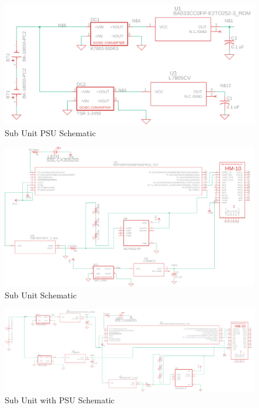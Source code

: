 \documentclass[12pt]{article}
\begin{document}
\begin{landscape}
  \begin{center}
  \begin{figure}[H]
    \includegraphics[width=1.6\textwidth, left]{../Modular Design/Sub-Unit-PSU/Figures/sub-unit-psu.png}
    \caption{Sub Unit PSU Schematic}
    \label{fig:sub-psu-schematic}
  \end{figure}
  \end{center}
  \begin{center}
  \begin{figure}[H]
    \includegraphics[width=1.6\textwidth, left]{../Appendix/Figures/sub-unit.png}
    \caption{Sub Unit Schematic}
    \label{fig:sub-schematic}
  \end{figure}
  \end{center}

  \begin{center}
  \begin{figure}[H]
    \includegraphics[width=\pdfpagewidth,height=0.65\textheight]{../Modular Design/Sub-Unit/Figures/sub-unit-and-psu.png}
    \caption{Sub Unit with PSU Schematic}
    \label{fig:sub-with-psu-schematic}
  \end{figure}
  \end{center}

\end{landscape}
\end{document}
